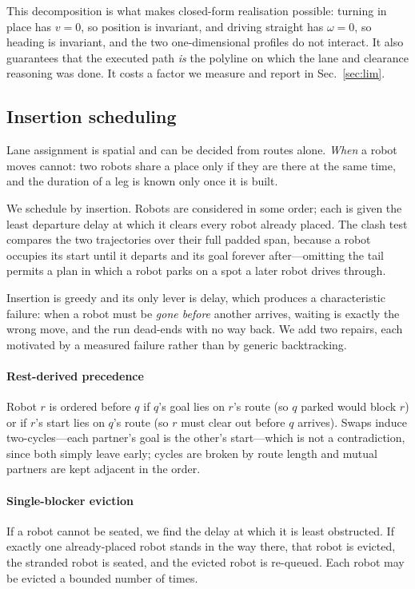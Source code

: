 \documentclass[conference]{IEEEtran}
\begin{document}
This decomposition is what makes closed-form realisation possible: turning in place has
$v = 0$, so position is invariant, and driving straight has $\omega = 0$, so heading is
invariant, and the two one-dimensional profiles do not interact. It also guarantees that the
executed path \emph{is} the polyline on which the lane and clearance reasoning was done. It
costs a factor we measure and report in Sec.~\ref{sec:lim}.

\subsection{Insertion scheduling}
\label{sec:sched}

Lane assignment is spatial and can be decided from routes alone. \emph{When} a robot moves
cannot: two robots share a place only if they are there at the same time, and the duration
of a leg is known only once it is built.

We schedule by insertion. Robots are considered in some order; each is given the least
departure delay at which it clears every robot already placed. The clash test compares the
two trajectories over their full padded span, because a robot occupies its start until it
departs and its goal forever after---omitting the tail permits a plan in which a robot
parks on a spot a later robot drives through.

Insertion is greedy and its only lever is delay, which produces a characteristic failure:
when a robot must be \emph{gone before} another arrives, waiting is exactly the wrong
move, and the run dead-ends with no way back. We add two repairs, each motivated by a
measured failure rather than by generic backtracking.

\paragraph{Rest-derived precedence} Robot $r$ is ordered before $q$ if $q$'s goal lies on
$r$'s route (so $q$ parked would block $r$) or if $r$'s start lies on $q$'s route (so $r$
must clear out before $q$ arrives). Swaps induce two-cycles---each partner's goal is the
other's start---which is not a contradiction, since both simply leave early; cycles are
broken by route length and mutual partners are kept adjacent in the order.

\paragraph{Single-blocker eviction} If a robot cannot be seated, we find the delay at which
it is least obstructed. If exactly one already-placed robot stands in the way there, that
robot is evicted, the stranded robot is seated, and the evicted robot is re-queued. Each
robot may be evicted a bounded number of times.
\end{document}
